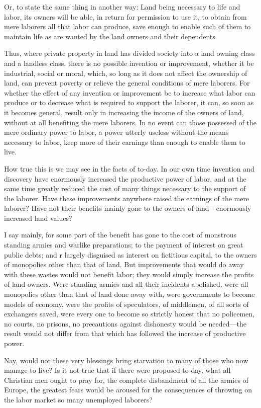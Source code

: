 \documentclass{book}
\begin{document}
Or, to state the same thing in another way: Land being necessary to life and labor, its owners will be able, in return for permission to use it, to obtain from mere laborers all that labor can produce, save enough to enable such of them to maintain life as are wanted by the land owners and their dependents.

Thus, where private property in land has divided society into a land owning class and a landless class, there is no possible invention or improvement, whether it be industrial, social or moral, which, so long as it does not affect the ownership of land, can prevent poverty or relieve the general conditions of mere laborers. For whether the effect of any invention or improvement be to increase what labor can produce or to decrease what is required to support the laborer, it can, so soon as it becomes general, result only in increasing the income of the owners of land, without at all benefiting the mere laborers. In no event can those possessed of the mere ordinary power to labor, a power utterly useless without the means necessary to labor, keep more of their earnings than enough to enable them to live.

How true this is we may see in the facts of to-day. In our own time invention and discovery have enormously increased the productive power of labor, and at the same time greatly reduced the cost of many things necessary to the support of the laborer. Have these improvements anywhere raised the earnings of the mere laborer? Have not their benefits mainly gone to the owners of land—enormously increased land values?

I say mainly, for some part of the benefit has gone to the cost of monstrous standing armies and warlike preparations; to the payment of interest on great public debts; and r largely disguised as interest on fictitious capital, to the owners of monopolies other than that of land. But improvements that would do away with these wastes would not benefit labor; they would simply increase the profits of land owners. Were standing armies and all their incidents abolished, were all monopolies other than that of land done away with, were governments to become models of economy, were the profits of speculators, of middlemen, of all sorts of exchangers saved, were every one to become so strictly honest that no policemen, no courts, no prisons, no precautions against dishonesty would be needed—the result would not differ from that which has followed the increase of productive power.

Nay, would not these very blessings bring starvation to many of those who now manage to live? Is it not true that if there were proposed to-day, what all Christian men ought to pray for, the complete disbandment of all the armies of Europe, the greatest fears would be aroused for the consequences of throwing on the labor market so many unemployed laborers?
\end{document}
